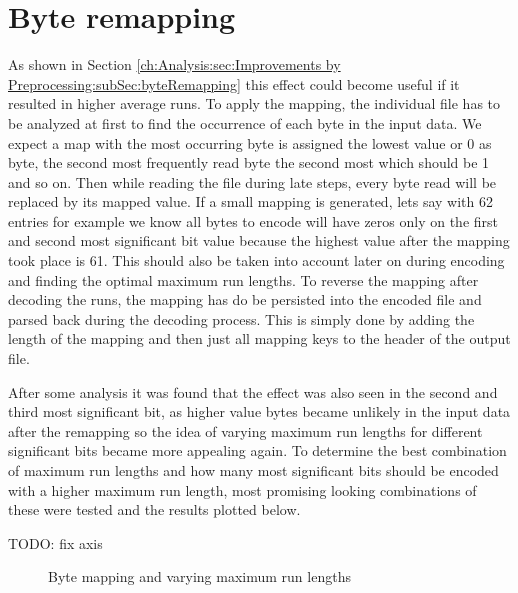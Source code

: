 \section{Byte remapping}
\par{
As shown in Section \ref{ch:Analysis:sec:Improvements by Preprocessing:subSec:byteRemapping} this effect could become useful if it resulted in higher average runs. To apply the mapping, the individual file has to be analyzed at first to find the occurrence of each byte in the input data. We expect a map with the most occurring byte is assigned the lowest value or 0 as byte, the second most frequently read byte the second most which should be 1 and so on. Then while reading the file during late steps, every byte read will be replaced by its mapped value. If a small mapping is generated, lets say with 62 entries for example we know all bytes to encode will have zeros only on the first and second most significant bit value because the highest value after the mapping took place is 61. This should also be taken into account later on during encoding and finding the optimal maximum run lengths.
To reverse the mapping after decoding the runs, the mapping has do be persisted into the encoded file and parsed back during the decoding process. This is simply done by adding the length of the mapping and then just all mapping keys to the header of the output file. 
}
\par{
After some analysis it was found that the effect was also seen in the second and third most significant bit, as higher value bytes became unlikely in the input data after the remapping so the idea of varying maximum run lengths for different significant bits became more appealing again. To determine the best combination of maximum run lengths and how many most significant bits should be encoded with a higher maximum run length, most promising looking combinations of these were tested and the results plotted below.

TODO: fix axis
}
\begin{figure}[h]
\caption{Byte mapping and varying maximum run lengths}
\label{fig:2:Byte mapping and varying maximum run lengths}
\end{figure}

